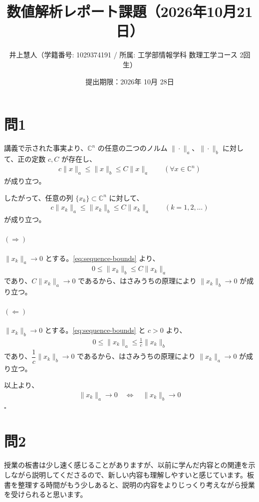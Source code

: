 \documentclass[a4j]{jarticle}
\begin{document}
\title{数値解析レポート課題（2026年10月21日）}
\author{井上慧人（学籍番号: 1029374191 / 所属: 工学部情報学科 数理工学コース 2回生）}
\date{提出期限：2026年 10月 28日}
\maketitle

\section*{問1}

講義で示された事実より、$\mathbb{C}^n$ の任意の二つのノルム
$\|\cdot\|_a$、$\|\cdot\|_b$ に対して、正の定数 $c,C$ が存在し、
\begin{align}
  c\|x\|_a \leq \|x\|_b \leq C\|x\|_a
  \qquad (\forall x\in\mathbb{C}^n)
  \label{eq:norm-equivalence}
\end{align}
が成り立つ。

したがって、任意の列 $\{x_k\}\subset\mathbb{C}^n$ に対して、
\begin{align}
  c\|x_k\|_a \leq \|x_k\|_b \leq C\|x_k\|_a
  \qquad (k=1,2,\ldots)
  \label{eq:sequence-bounds}
\end{align}
が成り立つ。

\paragraph{$(\Rightarrow)$}
$\|x_k\|_a\to 0$ とする。\eqref{eq:sequence-bounds} より、
\begin{align}
  0\leq\|x_k\|_b\leq C\|x_k\|_a
\end{align}
であり、$C\|x_k\|_a\to 0$ であるから、はさみうちの原理により
$\|x_k\|_b\to 0$ が成り立つ。

\paragraph{$(\Leftarrow)$}
$\|x_k\|_b\to 0$ とする。\eqref{eq:sequence-bounds} と $c>0$ より、
\begin{align}
  0\leq\|x_k\|_a\leq\frac{1}{c}\|x_k\|_b
\end{align}
であり、$\dfrac{1}{c}\|x_k\|_b\to 0$ であるから、はさみうちの原理により
$\|x_k\|_a\to 0$ が成り立つ。

以上より、
\begin{align}
  \|x_k\|_a\to 0
  \quad\Longleftrightarrow\quad
  \|x_k\|_b\to 0
\end{align}
\hfill$\square$

\section*{問2}

\noindent
授業の板書は少し速く感じることがありますが、以前に学んだ内容との関連を示しながら説明してくださるので、新しい内容も理解しやすいと感じています。板書を整理する時間がもう少しあると、説明の内容をよりじっくり考えながら授業を受けられると思います。
\end{document}
